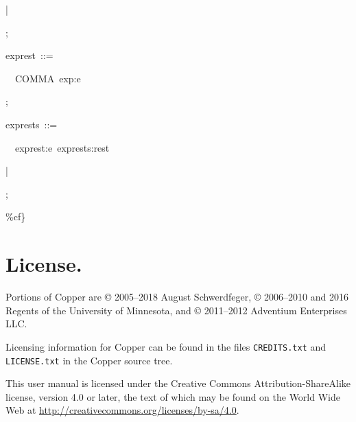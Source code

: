 \documentclass[12pt,english,twoside]{report}
\newenvironment{codeblock}
{\begin{list}{}{
\setlength{\rightmargin}{\leftmargin}
\setlength{\listparindent}{0pt}%
\raggedright
\setlength{\itemsep}{0pt}
\setlength{\parsep}{0pt}
\normalfont\ttfamily}%
 \item[]}
{\end{list}}
\begin{document}
\begin{codeblock}
\begin{codeblock}
\begin{codeblock}
|~

;
\end{codeblock}
exprest~::=
\begin{codeblock}
~~COMMA~exp:e~

;
\end{codeblock}
exprests~::=
\begin{codeblock}
~~exprest:e~exprests:rest~

|~

;
\end{codeblock}
\end{codeblock}
\%cf\}
\end{codeblock}

\chapter{\label{cha:License.}License.}

Portions of Copper are \copyright{} 2005--2018 August
Schwerdfeger, \copyright{} 2006--2010 and 2016 Regents of the University of
Minnesota, and \copyright{} 2011--2012 Adventium Enterprises LLC.

Licensing information for Copper can be found in the files
\texttt{CREDITS.txt} and \texttt{LICENSE.txt} in the Copper source
tree.

This user manual is licensed under the Creative
Commons Attribution-ShareAlike license, version 4.0 or later, the text
of which may be found on the World Wide Web at
\url{http://creativecommons.org/licenses/by-sa/4.0}.
\end{document}
